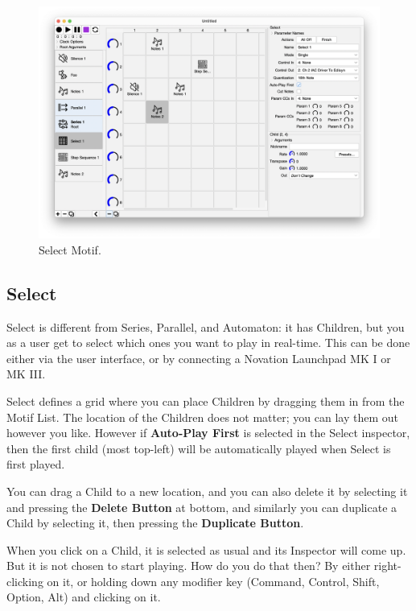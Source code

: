 \documentclass[twoside,10pt]{article}
\begin{document}
\begin{figure}[t]
\centering
\includegraphics[width=6.5in]{Select}
\vspace{-2em}
\caption{Select Motif.}
\label{select}
\end{figure}

\subsection{Select}

Select is different from Series, Parallel, and Automaton: it has Children, but you as a user get to select which ones you want to play in real-time.  This can be done either via the user interface, or by connecting a Novation Launchpad MK I or MK III.

Select defines a grid where you can place Children by dragging them in from the Motif List.  The location of the Children does not matter; you can lay them out however you like.  However if {\bf Auto-Play First} is selected in the Select inspector, then the first child (most top-left) will be automatically played when Select is first played.

You can drag a Child to a new location, and you can also  delete it by selecting it and pressing the {\bf Delete Button} at bottom, and similarly you can duplicate a Child by selecting it, then pressing the {\bf Duplicate Button}. 

When you click on a Child, it is selected as usual and its Inspector will come up.  But it is not chosen to start playing.  How do you do that then?  By either right-clicking on it, or holding down any modifier key (Command, Control, Shift, Option, Alt) and clicking on it.
\end{document}
